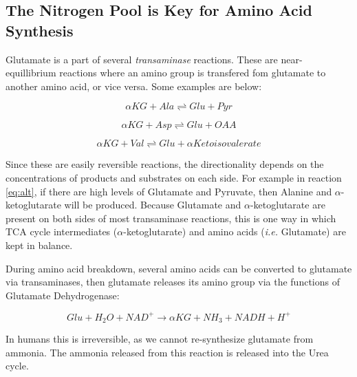 \documentclass{tufte-handout}
\begin{document}
\subsection{The Nitrogen Pool is Key for Amino Acid Synthesis}

Glutamate is a part of several \emph{transaminase} reactions.  These are near-equillibrium reactions where an amino group is transfered fom glutamate to another amino acid, or vice versa.  Some examples are below:

 \begin{equation}\label{eq:alt}
\alpha KG + Ala \rightleftharpoons Glu + Pyr
\end{equation}

 \begin{equation}\label{eq:ast}
\alpha KG + Asp \rightleftharpoons Glu + OAA
\end{equation}

 \begin{equation}
\alpha KG + Val \rightleftharpoons Glu +\alpha Ketoisovalerate
\end{equation}

Since these are easily reversible reactions, the directionality depends on the concentrations of products and substrates on each side.  For example in reaction \ref{eq:alt}, if there are high levels of Glutamate and Pyruvate, then  Alanine and $\alpha$-ketoglutarate will be produced.  Because Glutamate and $\alpha$-ketoglutarate are present on both sides of most transaminase reactions, this is one way in which TCA cycle intermediates ($\alpha$-ketoglutarate) and amino acids (\textit{i.e.} Glutamate) are kept in balance.

  During amino acid breakdown, several amino acids can be converted to glutamate via transaminases, then glutamate releases its amino group via the functions of Glutamate Dehydrogenase:

\begin{equation}\label{eq:GDH}
Glu + H_2O + NAD^+  \rightarrow  \alpha KG + NH_3 + NADH + H^+
\end{equation}

In humans this is irreversible, as we cannot re-synthesize glutamate from ammonia.  The ammonia released from this reaction is released into the Urea cycle.
\end{document}
